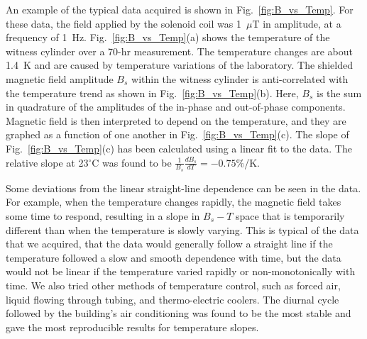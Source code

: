 An example of the typical data acquired is shown in
Fig.~\ref{fig:B_vs_Temp}.  For these data, the field applied by the
solenoid coil was 1~$\mu$T in amplitude, at a frequency of 1~Hz.
Fig.~\ref{fig:B_vs_Temp}(a) shows the temperature of the witness
cylinder over a 70-hr measurement.  The temperature changes are about
1.4~K and are caused by temperature variations of the laboratory.
%
%
The shielded magnetic field amplitude $B_s$ within the witness
cylinder is anti-correlated with the temperature trend as shown in
Fig.~\ref{fig:B_vs_Temp}(b).  Here, $B_s$ is the sum in quadrature of
the amplitudes of the in-phase and out-of-phase components.  Magnetic
field is then interpreted to depend on the temperature, and they are
graphed as a function of one another in Fig.~\ref{fig:B_vs_Temp}(c).
The slope of Fig.~\ref{fig:B_vs_Temp}(c) has been calculated using a
linear fit to the data.  The relative slope at 23$^\circ$C was found
to be $\frac{1}{B_s}\frac{dB_s}{dT}=-0.75\%$/K.

Some deviations from the linear straight-line dependence can be seen
in the data.  For example, when the temperature changes rapidly, the
magnetic field takes some time to respond, resulting in a slope in
$B_s-T$ space that is temporarily different than when the temperature
is slowly varying.  This is typical of the data that we acquired, that
the data would generally follow a straight line if the temperature
followed a slow and smooth dependence with time, but the data would
not be linear if the temperature varied rapidly or non-monotonically
with time.  We also tried other methods of temperature control, such
as forced air, liquid flowing through tubing, and thermo-electric
coolers.  The diurnal cycle followed by the building's air
conditioning was found to be the most stable and gave the most
reproducible results for temperature slopes.




